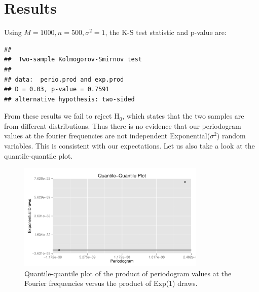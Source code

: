 \documentclass{article}\usepackage[]{graphicx}\usepackage[]{color}
\makeatletter
\newenvironment{kframe}{%
 \def\at@end@of@kframe{}%
 \ifinner\ifhmode%
  \def\at@end@of@kframe{\end{minipage}}%
  \begin{minipage}{\columnwidth}%
 \fi\fi%
 \def\FrameCommand##1{\hskip\@totalleftmargin \hskip-\fboxsep
 \colorbox{shadecolor}{##1}\hskip-\fboxsep
     \hskip-\linewidth \hskip-\@totalleftmargin \hskip\columnwidth}%
 \MakeFramed {\advance\hsize-\width
   \@totalleftmargin\z@ \linewidth\hsize
   \@setminipage}}%
 {\par\unskip\endMakeFramed%
 \at@end@of@kframe}
\newenvironment{knitrout}{}{} %
\theoremstyle{plain}
\makeatother
\begin{document}
\section*{Results}
Using $M = 1000, n = 500, \sigma^2 = 1$, the K-S test statistic and p-value are:
\begin{knitrout}
\color{fgcolor}\begin{kframe}
\begin{verbatim}
## 
## 	Two-sample Kolmogorov-Smirnov test
## 
## data:  perio.prod and exp.prod
## D = 0.03, p-value = 0.7591
## alternative hypothesis: two-sided
\end{verbatim}
\end{kframe}
\end{knitrout}

From these results we fail to reject $\text{H}_0$, which states that the two samples are from different distributions. Thus there is no evidence that our periodogram values at the fourier frequencies are not independent Exponential($\sigma^2$) random variables. This is consistent with our expectations. Let us also take a look at the quantile-quantile plot.
\begin{knitrout}
\color{fgcolor}\begin{figure}[H]


{\centering \includegraphics[width=0.8\textwidth]{figure/qqplot} 

}

\caption[Quantile-quantile plot of the product of periodogram values at the Fourier frequencies versus the product of Exp(1) draws]{Quantile-quantile plot of the product of periodogram values at the Fourier frequencies versus the product of Exp(1) draws.\label{fig:qqplot}}
\end{figure}


\end{knitrout}
\end{document}
